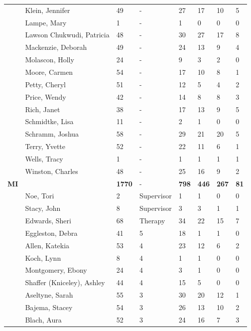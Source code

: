 \documentclass{article}\usepackage[]{graphicx}\usepackage[]{color}
\begin{document}
{\begin{longtable} { >{\raggedright}p{}p{}p{}p{}p{}p{}p{}p{}}
   & Klein, Jennifer & 49 & - & 27 & 17 & 10 & 5 \\ 
   & Lampe, Mary & 1 & - & 1 & 0 & 0 & 0 \\ 
   \rowcolor[gray]{0.90} & Lawson Chukwudi, Patricia & 48 & - & 30 & 27 & 17 & 8 \\ 
   \rowcolor[gray]{0.90} & Mackenzie, Deborah & 49 & - & 24 & 13 & 9 & 4 \\ 
   \rowcolor[gray]{0.90} & Molascon, Holly & 24 & - & 9 & 3 & 2 & 0 \\ 
   & Moore, Carmen & 54 & - & 17 & 10 & 8 & 1 \\ 
   & Petty, Cheryl & 51 & - & 12 & 5 & 4 & 2 \\ 
   & Price, Wendy & 42 & - & 14 & 8 & 8 & 3 \\ 
   \rowcolor[gray]{0.90} & Rich, Janet & 38 & - & 17 & 13 & 9 & 5 \\ 
   \rowcolor[gray]{0.90} & Schmidtke, Lisa & 11 & - & 2 & 1 & 0 & 0 \\ 
   \rowcolor[gray]{0.90} & Schramm, Joshua & 58 & - & 29 & 21 & 20 & 5 \\ 
   & Terry, Yvette & 52 & - & 22 & 11 & 6 & 1 \\ 
   & Wells, Tracy & 1 & - & 1 & 1 & 1 & 1 \\ 
   & Winston, Charles & 48 & - & 25 & 16 & 9 & 2 \\ 
   \hline
\textbf{MI} &  & \textbf{1770} & - & \textbf{798} & \textbf{446} & \textbf{267} & \textbf{81} \\ 
   \rowcolor[gray]{0.90} & Noe, Tori & 2 & Supervisor & 1 & 1 & 0 & 0 \\ 
   \rowcolor[gray]{0.90} & Stacy, John & 8 & Supervisor & 3 & 3 & 1 & 1 \\ 
   & Edwards, Sheri & 68 & Therapy & 34 & 22 & 15 & 7 \\ 
   & Eggleston, Debra & 41 & 5 & 18 & 1 & 1 & 0 \\ 
   & Allen, Katekia & 53 & 4 & 23 & 12 & 6 & 2 \\ 
   \rowcolor[gray]{0.90} & Koch, Lynn & 8 & 4 & 1 & 1 & 0 & 0 \\ 
   \rowcolor[gray]{0.90} & Montgomery, Ebony & 24 & 4 & 3 & 1 & 0 & 0 \\ 
   \rowcolor[gray]{0.90} & Shaffer (Kniceley), Ashley & 44 & 4 & 15 & 5 & 0 & 0 \\ 
   & Aseltyne, Sarah & 55 & 3 & 30 & 20 & 12 & 1 \\ 
   & Bajema, Stacey & 54 & 3 & 26 & 13 & 10 & 2 \\ 
   & Blach, Aura & 52 & 3 & 24 & 16 & 7 & 3 \\ 

\end{longtable}}
\end{document}
